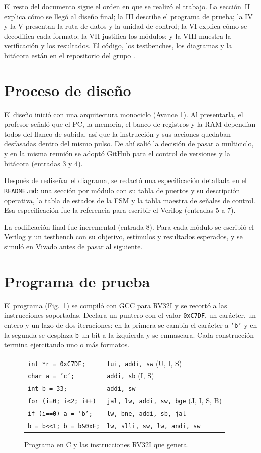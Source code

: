 \documentclass[conference]{IEEEtran}
\newcommand{\cod}[1]{\texttt{\small #1}}
\begin{document}
El resto del documento sigue el orden en que se realizó el trabajo. La sección~II explica cómo se llegó al diseño final; la III describe el programa de prueba; la IV y la V presentan la ruta de datos y la unidad de control; la VI explica cómo se decodifica cada formato; la VII justifica los módulos; y la VIII muestra la verificación y los resultados. El código, los testbenches, los diagramas y la bitácora están en el repositorio del grupo \cite{repo}.

\section{Proceso de diseño}
El diseño inició con una arquitectura monociclo (Avance 1). Al presentarla, el profesor señaló que el PC, la memoria, el banco de registros y la RAM dependían todos del flanco de subida, así que la instrucción y sus acciones quedaban desfasadas dentro del mismo pulso. De ahí salió la decisión de pasar a multiciclo, y en la misma reunión se adoptó GitHub para el control de versiones y la bitácora (entradas 3 y 4).

Después de rediseñar el diagrama, se redactó una especificación detallada en el \cod{README.md}: una sección por módulo con su tabla de puertos y su descripción operativa, la tabla de estados de la FSM y la tabla maestra de señales de control. Esa especificación fue la referencia para escribir el Verilog (entradas 5 a 7).

La codificación final fue incremental (entrada 8). Para cada módulo se escribió el Verilog y un testbench con su objetivo, estímulos y resultados esperados, y se simuló en Vivado antes de pasar al siguiente.

\section{Programa de prueba}
El programa (Fig.~\ref{fig:c}) se compiló con GCC para RV32I y se recortó a las instrucciones soportadas. Declara un puntero con el valor \cod{0xC7DF}, un carácter, un entero y un lazo de dos iteraciones: en la primera se cambia el carácter a \texttt{'b'} y en la segunda se desplaza \cod{b} un bit a la izquierda y se enmascara. Cada construcción termina ejercitando uno o más formatos.

\begin{figure}[H]
\centering\footnotesize
\begin{tabular}{@{}l@{\hspace{1.2em}}l@{}}
\texttt{int *r = 0xC7DF;} & \cod{lui, addi, sw} (U, I, S)\\
\texttt{char a = 'c';} & \cod{addi, sb} (I, S)\\
\texttt{int b = 33;} & \cod{addi, sw}\\
\texttt{for (i=0; i<2; i++)} & \cod{jal, lw, addi, sw, bge} (J, I, S, B)\\
\texttt{if (i==0) a = 'b';} & \cod{lw, bne, addi, sb, jal}\\
\texttt{b = b<<1; b = b\&0xF;} & \cod{lw, slli, sw, lw, andi, sw}
\end{tabular}
\caption{Programa en C y las instrucciones RV32I que genera.}\label{fig:c}
\end{figure}
\end{document}
